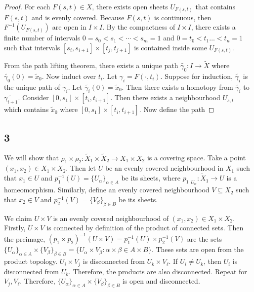 \documentclass{article}
\theoremstyle{definition}
\numberwithin{theorem}{section}
\numberwithin{equation}{section}
\newcommand{\cover}{\widetilde{X}}
\begin{document}
\begin{proof}
    For each $F(s, t) \in X$, there exists open sheets $U_{F(s, t)}$ that contains $F(s, t)$ and is evenly covered. Because $F(s, t)$ is continuous, then $F^{-1}(U_{F(s, t)})$ are open in $I \times I$. By the compactness of $I \times I$, there exists a finite number of intervals $0 = s_0 < s_1 < \cdots < s_m = 1$ and $0 = t_0 < t_1 \ldots < t_n = 1$ such that intervals $[s_i, s_{i + 1}] \times [t_j, t_{j + 1}]$ is contained inside some $U_{F(s,t)}$.

    From the path lifting theorem, there exists a unique path $\widetilde{\gamma_0} : I \rightarrow \tilde{X}$ where $\widetilde{\gamma_0}(0) = \tilde{x}_0$. Now induct over $t_i$. Let $\gamma_i = F(\cdot, t_i)$. Suppose for induction, $\widetilde{\gamma_i}$ is the unique path of $\gamma_i$. Let $\widetilde{\gamma_i}(0) = \tilde{x}_0$. Then there exists a homotopy from $\widetilde{\gamma_i}$ to $\widetilde{\gamma_{i + 1}}$. Consider $[0, s_1] \times [t_i, t_{i + 1}]$. Then there exists a neighbourhood $U_{s, t}$ which contains $ \tilde{x}_0$ where $[0, s_1] \times [t_i, t_{i + 1}]$. Now define the path 
\end{proof}

\subsection{3}
We will show that $\rho_1 \times \rho_2: \cover_1 \times \cover_2 \rightarrow X_1 \times X_2$ is a covering space. 
Take a point $(x_1, x_2) \in X_1 \times X_2$. Then let $U$ be an evenly covered neighbourhood in $X_1$ such that $x_1 \in U$ and $p_1^{-1}(U) = \{U_\alpha \}_{\alpha \in A}$ be its sheets, where $p_1|_{U_\alpha}: \cover_1 \rightarrow U$ is a homeomorphism. Similarly, define an evenly covered neighbourhood $V \subseteq X_2$ such that $x_2 \in V$ and $p_2^{-1}(V) = \{V_\beta \}_{\beta \in B}$ be its sheets. 

We claim $U \times V$ is an evenly covered neighbourhood of $(x_1, x_2) \in X_1 \times X_2$. Firstly, $U \times V$ is connected by definition of the product of connected sets. Then the preimage, $(p_1 \times p_2)^{-1}(U \times V) = p_1^{-1}(U) \times p_2^{-1}(V)$ are the sets $\{U_\alpha \}_{\alpha \in A} \times \{V_\beta \}_{\beta \in B} = \{U_\alpha \times V_\beta : \alpha \times \beta \in A \times B\}$. These sets are open from the product topology. $U_i \times V_j$ is disconnected from $U_k \times V_\ell$. If $U_i \neq U_k$, then $U_i$ is disconnected from $U_k$. Therefore, the products are also disconnected. Repeat for $V_j, V_\ell$. Therefore, $\{U_\alpha \}_{\alpha \in A} \times \{V_\beta \}_{\beta \in B} $ is open and disconnected.
\end{document}
